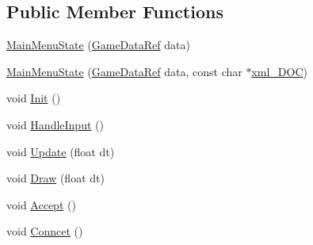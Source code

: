 \subsection*{Public Member Functions}
\begin{DoxyCompactItemize}
\item 
\hyperlink{classSekander_1_1MainMenuState_a6358c7103ad56cb05813567ab1d591ba}{Main\+Menu\+State} (\hyperlink{namespaceSekander_a1d69b002ba2d23020901c28f0def5e16}{Game\+Data\+Ref} data)
\item 
\hyperlink{classSekander_1_1MainMenuState_aeeea19d38e84e2ed002a4b47d6d8885e}{Main\+Menu\+State} (\hyperlink{namespaceSekander_a1d69b002ba2d23020901c28f0def5e16}{Game\+Data\+Ref} data, const char $\ast$\hyperlink{classSekander_1_1MainMenuState_ab1dafb7e7d50beb5418e72334f81dabd}{xml\+\_\+\+D\+OC})
\item 
void \hyperlink{classSekander_1_1MainMenuState_a45ea852b4aa57ee6c6204da1262c5e91}{Init} ()
\item 
void \hyperlink{classSekander_1_1MainMenuState_a960cd5207d1869e28d6388e267672397}{Handle\+Input} ()
\item 
void \hyperlink{classSekander_1_1MainMenuState_aabbfda236df88eee953e3b88ca8e7631}{Update} (float dt)
\item 
void \hyperlink{classSekander_1_1MainMenuState_a18aceffe0c53cf90263c24665de379c1}{Draw} (float dt)
\item 
void \hyperlink{classSekander_1_1MainMenuState_ab70a367c525cfb7bc8e0f5497c1159a9}{Accept} ()
\item 
void \hyperlink{classSekander_1_1MainMenuState_ab29df2f2392625cddc8c414f9a67a320}{Conncet} ()
\end{DoxyCompactItemize}
